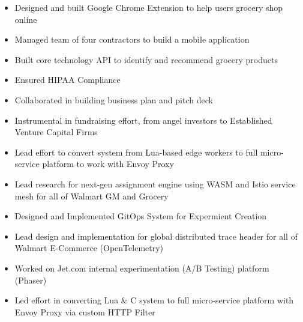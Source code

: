 \documentclass[10pt,a4paper,ragged2e,withhyper]{altacv}
\begin{document}
\begin{paracol}{2}

\begin{itemize}
  \item Designed and built Google Chrome Extension to help users grocery shop online
  \item Managed team of four contractors to build a mobile application
  \item Built core technology API to identify and recommend grocery products
  \item Ensured HIPAA Compliance
  \item Collaborated in building business plan and pitch deck
  \item Instrumental in fundraising effort, from angel investors to Established Venture Capital Firms
\end{itemize}

\divider

\begin{itemize}
  \item Lead effort to convert system from Lua-based edge workers to full micro-service platform to work with Envoy Proxy
  \item Lead research for next-gen assignment engine using WASM and Istio service mesh for all of Walmart GM and Grocery
  \item Designed and Implemented GitOps System for Expermient Creation
  \item Lead design and implementation for global distributed trace header for all of Walmart E-Commerce (OpenTelemetry)
\end{itemize}

\divider

\begin{itemize}
  \item Worked on Jet.com internal experimentation (A/B Testing) platform (Phaser)
  \item Led effort in converting Lua \& C system to full micro-service platform with Envoy Proxy via custom HTTP Filter
\end{itemize}


\end{paracol}
\end{document}
